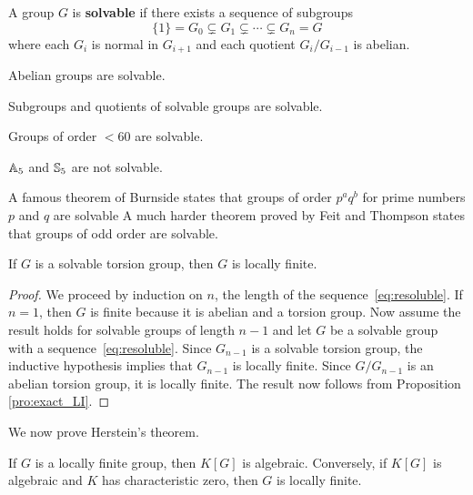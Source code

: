 A group $G$ is
\textbf{solvable} if there exists a sequence
of subgroups 
\begin{equation}
	\label{eq:resoluble}
	\{1\}=G_0\subsetneq G_1\subsetneq \cdots\subsetneq G_n=G
\end{equation}
where each $G_i$ is normal in $G_{i+1}$ and each 
quotient $G_i/G_{i-1}$ is
abelian.

\begin{example}
    Abelian groups are solvable. 
\end{example}

Subgroups and quotients of solvable groups are solvable. 

\begin{example}
    Groups of order $<60$ are solvable.
\end{example}

\begin{example}
    $\mathbb{A}_5$ and $\mathbb{S}_5$ are not solvable. 
\end{example}

A famous theorem of Burnside states that 
groups of order $p^aq^b$ for prime numbers $p$ and $q$ are solvable 
A much harder theorem proved by Feit and Thompson states that
groups of odd order are solvable.

\begin{proposition}
	If $G$ is a solvable torsion group, 
	then $G$ is locally finite. 
\end{proposition}

\begin{proof}
	We proceed by induction on $n$, the length of the sequence~\eqref{eq:resoluble}. 
	If $n=1$, then $G$ is finite because it is abelian and a torsion group.
	Now assume the result holds for solvable groups of length $n-1$ and let
	$G$ be a solvable group with a sequence~\eqref{eq:resoluble}. Since $G_{n-1}$ is 
	a solvable torsion group, the inductive hypothesis implies that 
	$G_{n-1}$ is locally finite. Since $G/G_{n-1}$ is an abelian torsion group, 
	it is locally finite. The result now follows from Proposition \ref{pro:exact_LI}.
\end{proof}

We now prove Herstein's theorem.

\begin{theorem}[Herstein]
	If $G$ is a locally finite group, then $K[G]$ is algebraic. Conversely, if 
	$K[G]$ is algebraic and $K$ has characteristic zero, then $G$ 
	is locally finite. 
\end{theorem}


